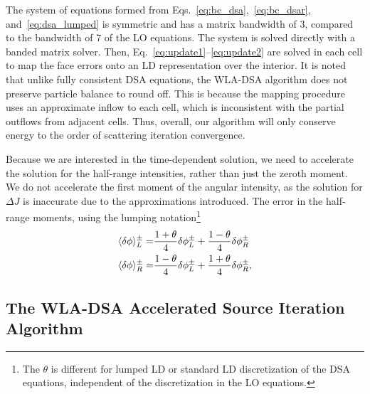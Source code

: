 The system of equations formed from Eqs.~\eqref{eq:bc_dsa},~\eqref{eq:bc_dsar},
and~\eqref{eq:dsa_lumped} is symmetric and has a matrix bandwidth of 3, compared to the
bandwidth of 7 of the LO equations.  The system is solved directly with a banded matrix solver. Then,
Eq.~\eqref{eq:update1}--\eqref{eq:update2} are solved in each cell to map the face errors onto
an LD representation over the interior.   It is noted that unlike fully consistent DSA equations, the WLA-DSA algorithm does not
preserve particle balance to round off.  This is because the mapping procedure uses an
approximate inflow to each cell, which is inconsistent with the partial outflows from
adjacent cells.  Thus, overall, our algorithm will only conserve energy to the order of
scattering iteration convergence.

Because we are interested in the time-dependent solution, we need to accelerate the solution for the
half-range intensities, rather than just the zeroth moment. We do not accelerate the first
moment of the angular intensity, as the solution for $\Delta J$ is inaccurate due to the
approximations introduced.  The error in the half-range moments, using
the lumping notation\footnote{The $\theta$ is different for lumped LD or standard LD
    discretization of the DSA equations, independent of the discretization in the LO
equations.} 
\begin{align}\label{eq:up1}
    \langle \delta \phi \rangle^{\pm}_L =&  \frac{1+\theta}{4}\delta \phi^{\pm}_{L} +
    \frac{1-\theta}{4}\delta \phi^{\pm}_{R}  \\ \label{eq:up2}
    \langle \delta \phi \rangle^{\pm}_R =&  \frac{1-\theta}{4}\delta \phi^{\pm}_{L} +
    \frac{1+\theta}{4}\delta \phi^{\pm}_{R}      ,
\end{align}

\subsection{The WLA-DSA Accelerated Source Iteration Algorithm}

